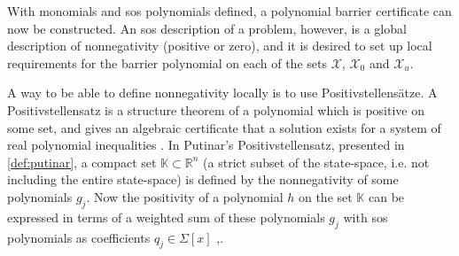 With monomials and \gls{sos} polynomials defined, a polynomial barrier certificate can now be constructed. An \gls{sos} description of a problem, however, is a global description of nonnegativity (positive or zero), and it is desired to set up local requirements for the barrier polynomial on each of the sets $\mathcal{X}$, $\mathcal{X}_0$ and $\mathcal{X}_u$. %

A way to be able to define nonnegativity locally is to use Positivstellens\"atze.
A Positivstellensatz is a structure theorem of a  polynomial which is positive on some set, and gives an algebraic certificate that a solution exists for a system of real polynomial inequalities \citep{bib:positivstellensatz}. 
In Putinar's Positivstellensatz, presented in \autoref{def:putinar}, a compact set $\mathbb{K}\subset\mathbb{R}^n$ (a strict subset of the state-space, i.e. not including the entire state-space) is defined by the nonnegativity of some polynomials $g_j$.
Now the positivity of a polynomial $h$ on the set $\mathbb{K}$ can be expressed in terms of a weighted sum of these polynomials $g_j$ with \gls{sos} polynomials as coefficients $q_j\in\Sigma[x]$ \citep[pp 184-186]{bib:sos_putinar_laurent},\citep[pp 28-29]{bib:sos_putinar_lasserre}.\\

